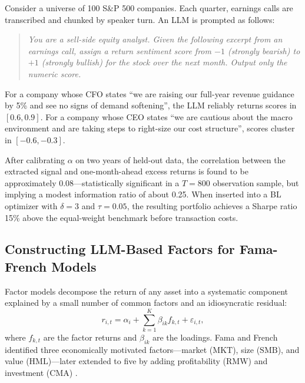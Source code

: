 \begin{example}
\label{ex:ch10-earnings-call-bl}
Consider a universe of 100 S\&P 500 companies. Each quarter, earnings calls are
transcribed and chunked by speaker turn. An LLM is prompted as follows:

\begin{quote}
\textit{You are a sell-side equity analyst. Given the following excerpt from an earnings
call, assign a return sentiment score from $-1$ (strongly bearish) to $+1$ (strongly
bullish) for the stock over the next month. Output only the numeric score.}
\end{quote}

For a company whose CFO states ``we are raising our full-year revenue guidance by 5\%
and see no signs of demand softening'', the LLM reliably returns scores in $[0.6, 0.9]$.
For a company whose CEO states ``we are cautious about the macro environment and are
taking steps to right-size our cost structure'', scores cluster in $[-0.6, -0.3]$.

After calibrating $\alpha$ on two years of held-out data, the correlation between
the extracted signal and one-month-ahead excess returns is found to be approximately
$0.08$---statistically significant in a $T = 800$ observation sample, but implying a
modest information ratio of about 0.25. When inserted into a BL optimizer with
$\delta = 3$ and $\tau = 0.05$, the resulting portfolio achieves a Sharpe ratio 15\%
above the equal-weight benchmark before transaction costs.
\end{example}

\subsection{Constructing LLM-Based Factors for Fama-French Models}
\label{sec:ch10-llm-factors-fama-french}

Factor models decompose the return of any asset into a systematic component explained by
a small number of common factors and an idiosyncratic residual:
\begin{equation}
  r_{i,t} = \alpha_i + \sum_{k=1}^{K} \beta_{ik} f_{k,t} + \varepsilon_{i,t},
  \label{eq:ch10-factor-model}
\end{equation}
where $f_{k,t}$ are the factor returns and $\beta_{ik}$ are the loadings. Fama and
French \citep{fama1993common} identified three economically motivated factors---market
($\text{MKT}$), size ($\text{SMB}$), and value ($\text{HML}$)---later extended to
five by adding profitability ($\text{RMW}$) and investment ($\text{CMA}$)
\citep{fama2015five}.

